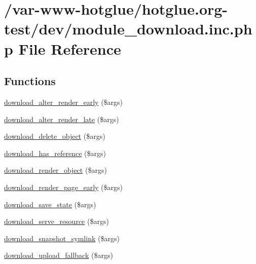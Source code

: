 \hypertarget{module__download_8inc_8php}{
\section{/var-\/www-\/hotglue/hotglue.org-\/test/dev/module\_\-download.inc.php File Reference}
\label{module__download_8inc_8php}
}
\subsection*{Functions}
\begin{DoxyCompactItemize}
\item 
\hyperlink{module__download_8inc_8php_a28d1b9ae20de8d1a271f15d308b1df31}{download\_\-alter\_\-render\_\-early} (\$args)
\item 
\hyperlink{module__download_8inc_8php_a61a6050abc43cf71d0ca422a9240ae7c}{download\_\-alter\_\-render\_\-late} (\$args)
\item 
\hyperlink{module__download_8inc_8php_a5fd781bf1e0393667b227abec7169b28}{download\_\-delete\_\-object} (\$args)
\item 
\hyperlink{module__download_8inc_8php_aa80da3f3fd41f7f00f97043f7a2431c8}{download\_\-has\_\-reference} (\$args)
\item 
\hyperlink{module__download_8inc_8php_a57c588f1fd0663aa16fd707a522bcc79}{download\_\-render\_\-object} (\$args)
\item 
\hyperlink{module__download_8inc_8php_ac980246bec838c65efd59bc25253b005}{download\_\-render\_\-page\_\-early} (\$args)
\item 
\hyperlink{module__download_8inc_8php_a2e9ee6868b80832b40e9072a8c644c88}{download\_\-save\_\-state} (\$args)
\item 
\hyperlink{module__download_8inc_8php_a930c9545346e8da3f3db5a97dc4d8c74}{download\_\-serve\_\-resource} (\$args)
\item 
\hyperlink{module__download_8inc_8php_ae1b136740fb3c1fe26820e1982f8d353}{download\_\-snapshot\_\-symlink} (\$args)
\item 
\hyperlink{module__download_8inc_8php_a678bcaf9018d772881b4291020894fa0}{download\_\-upload\_\-fallback} (\$args)
\end{DoxyCompactItemize}


